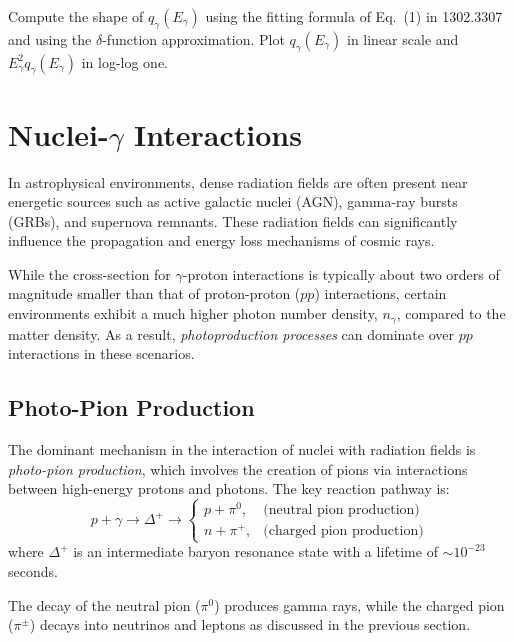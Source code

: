 \begin{problem}
Compute the shape of $q_\gamma(E_\gamma)$ using the fitting formula of Eq.~(1) in 1302.3307 and using the $\delta$-function approximation. Plot $q_\gamma(E_\gamma)$ in linear scale and $E_\gamma^2q_\gamma(E_\gamma)$ in log-log one. 
\end{problem}

\section{Nuclei-\(\gamma\) Interactions}

In astrophysical environments, dense radiation fields are often present near energetic sources such as active galactic nuclei (AGN), gamma-ray bursts (GRBs), and supernova remnants. These radiation fields can significantly influence the propagation and energy loss mechanisms of cosmic rays.  

While the cross-section for \(\gamma\)-proton interactions is typically about two orders of magnitude smaller than that of proton-proton (\(pp\)) interactions, certain environments exhibit a much higher photon number density, \(n_\gamma\), compared to the matter density. As a result, \emph{photoproduction processes} can dominate over \(pp\) interactions in these scenarios.  

\subsection{Photo-Pion Production}

The dominant mechanism in the interaction of nuclei with radiation fields is \emph{photo-pion production}, which involves the creation of pions via interactions between high-energy protons and photons. The key reaction pathway is: 
\begin{equation}\label{eq:deltares}
p + \gamma \rightarrow \Delta^+ \rightarrow
\begin{cases}
p + \pi^0, & \text{(neutral pion production)} \\
n + \pi^+, & \text{(charged pion production)} 
\end{cases}
\end{equation}
%
where \(\Delta^+\) is an intermediate baryon resonance state with a lifetime of \( \sim 10^{-23} \) seconds.  

The decay of the neutral pion (\(\pi^0\)) produces gamma rays, while the charged pion (\(\pi^\pm\)) decays into neutrinos and leptons as discussed in the previous section.

